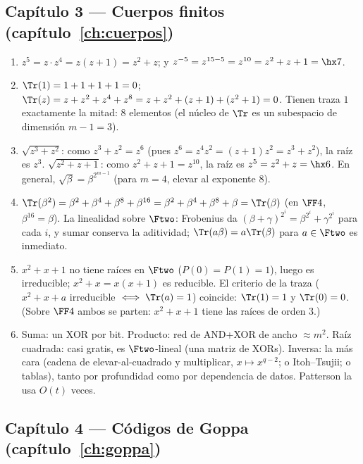 \subsection*{Capítulo 3 --- Cuerpos finitos
(capítulo~\ref{ch:cuerpos})}

\begin{enumerate}[leftmargin=1.9em,itemsep=4pt]
  \item $z^5=z\cdot z^4=z(z+1)=z^2+z$; y
        $z^{-5}=z^{15-5}=z^{10}=z^2+z+1=\hx7$.
  \item $\Tr(1)=1+1+1+1=0$; $\Tr(z)=z+z^2+z^4+z^8
        =z+z^2+(z+1)+(z^2+1)=0$. Tienen traza $1$ exactamente la
        mitad: $8$ elementos (el núcleo de $\Tr$ es un subespacio
        de dimensión $m-1=3$).
  \item $\sqrt{z^3+z^2}$: como $z^3+z^2=z^6$ (pues
        $z^6=z^4z^2=(z+1)z^2=z^3+z^2$), la raíz es $z^3$.
        $\sqrt{z^2+z+1}$: como $z^2+z+1=z^{10}$, la raíz es
        $z^5=z^2+z=\hx6$. En general, $\sqrt{\beta}=\beta^{2^{m-1}}$
        (para $m=4$, elevar al exponente $8$).
  \item $\Tr(\beta^2)=\beta^2+\beta^4+\beta^8+\beta^{16}
        =\beta^2+\beta^4+\beta^8+\beta=\Tr(\beta)$ (en $\FF4$,
        $\beta^{16}=\beta$). La linealidad sobre $\Ftwo$: Frobenius da
        $(\beta+\gamma)^{2^i}=\beta^{2^i}+\gamma^{2^i}$ para cada
        $i$, y sumar conserva la aditividad; $\Tr(a\beta)=a\Tr(\beta)$
        para $a\in\Ftwo$ es inmediato.
  \item $x^2+x+1$ no tiene raíces en $\Ftwo$ ($P(0)=P(1)=1$), luego
        es irreducible; $x^2+x=x(x+1)$ es reducible. El criterio de la
        traza ($x^2+x+a$ irreducible $\iff\Tr(a)=1$) coincide:
        $\Tr(1)=1$ y $\Tr(0)=0$. (Sobre $\FF4$ ambos se parten:
        $x^2+x+1$ tiene las raíces de orden $3$.)
  \item Suma: un XOR por bit. Producto: red de AND+XOR de ancho
        $\approx m^2$. Raíz cuadrada: casi gratis, es $\Ftwo$-lineal
        (una matriz de XORs). Inversa: la más cara (cadena de
        elevar-al-cuadrado y multiplicar, $x\mapsto x^{q-2}$; o
        Itoh--Tsujii; o tablas), tanto por profundidad como por
        dependencia de datos. Patterson la usa $O(t)$ veces.
\end{enumerate}

\subsection*{Capítulo 4 --- Códigos de Goppa
(capítulo~\ref{ch:goppa})}

